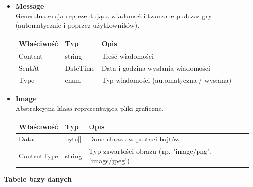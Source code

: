 \documentclass[12pt,a4paper]{article}
\begin{document}
\begin{itemize}
    \item \textbf{Message}\\
    Generalna encja reprezentująca wiadomości tworzone podczas gry (automatycznie i poprzez użytkowników).
    \renewcommand{\arraystretch}{1.5}
    \begin{longtable}{|m{4cm}|m{2cm}|m{8cm}|}
        \hline
        \rowcolor{lightgray}
        \textbf{Właściwość} & \textbf{Typ} & \textbf{Opis} \\ \hline
        \endhead
        \hline
        Content & string & Treść wiadomości \\ \hline
        SentAt & DateTime & Data i godzina wysłania wiadomości \\ \hline
        Type & enum & Typ wiadomości (automatyczna / wysłana) \\ \hline
    \end{longtable}

    \item \textbf{Image}\\
    Abstrakcyjna klasa reprezentująca pliki graficzne.
    \renewcommand{\arraystretch}{1.5}
    \begin{longtable}{|m{4cm}|m{2cm}|m{8cm}|}
        \hline
        \rowcolor{lightgray}
        \textbf{Właściwość} & \textbf{Typ} & \textbf{Opis} \\ \hline
        \endhead
        \hline
        Data & byte[] & Dane obrazu w postaci bajtów \\ \hline
        ContentType & string & Typ zawartości obrazu (np. "image/png", "image/jpeg") \\ \hline
    \end{longtable}
\end{itemize}

\newpage

\textbf{Tabele bazy danych}\\
\end{document}
